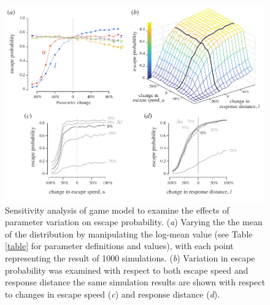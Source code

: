 \documentclass[]{rsos}%
\begin{document}
\begin{figure}[!h]
\centering
	\includegraphics[width=5.5in]{fig_sensitivity}
\caption{Sensitivity analysis of game model to examine the effects of parameter variation on escape probability. 
(\textit{a}) Varying the the mean of the distribution by manipulating the log-mean value (see Table \ref{table} for parameter definitions and values), with each point representing the result of 1000 simulations. 
(\textit{b}) Variation in escape probability was examined with respect to both escape speed and response distance the same simulation results are shown with respect to changes in escape speed (\textit{c}) and response distance (\textit{d}).
}
\label{fig_sense}
\end{figure}

\pagebreak
\end{document}
